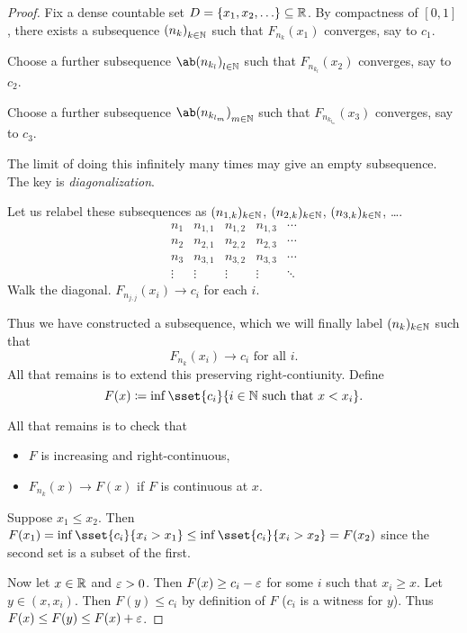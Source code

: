 \begin{proof}
    Fix a dense countable set $D = \set{x_1, x_2, \dots} \subseteq \R$.
    By compactness of $[0, 1]$,
    there exists a subsequence ${(n_k)}_{k \in \mathbb{N}}$ such that
    $F_{n_k}(x_1)$ converges, say to $c_1$.

    Choose a further subsequence ${\ab(n_{k_l})}_{l \in \N}$ such that
    $F_{n_{k_l}}(x_2)$ converges, say to $c_2$.

    Choose a further subsequence ${\ab(n_{k_{l_m}})}_{m \in \N}$ such that
    $F_{n_{k_{l_m}}}(x_3)$ converges, say to $c_3$.

    The limit of doing this infinitely many times may give an empty
    subsequence.
    The key is \emph{diagonalization}.

    Let us relabel these subsequences as
    $(n_{1, k})_{k \in \mathbb{N}}$, $(n_{2, k})_{k \in \mathbb{N}}$,
    $(n_{3, k})_{k \in \mathbb{N}}$, \dots.
    \[
        \begin{array}{c|cccc}
            n_1 & n_{1, 1} & n_{1, 2} & n_{1, 3} & \cdots \\
            n_2 & n_{2, 1} & n_{2, 2} & n_{2, 3} & \cdots \\
            n_3 & n_{3, 1} & n_{3, 2} & n_{3, 3} & \cdots \\
            \vdots & \vdots & \vdots & \vdots & \ddots
        \end{array}
    \] Walk the diagonal.
    $F_{n_{j, j}}(x_i) \to c_i$ for each $i$.

    Thus we have constructed a subsequence, which we will finally
    label $(n_k)_{k \in \mathbb{N}}$ such that \[
        F_{n_k}(x_i) \to c_i \text{ for all } i.
    \] All that remains is to extend this preserving right-contiunity.
    Define \[
        F(x) \coloneq \inf\sset{c_i}{i \in \N
                        \text{ such that } x < x_i}.
    \]

    All that remains is to check that
    \begin{itemize}
        \item $F$ is increasing and right-continuous,
        \item $F_{n_k}(x) \to F(x)$ if $F$ is continuous at $x$.
    \end{itemize}
    Suppose $x_1 \le x_2$.
    Then $F(x_1) = \inf\sset{c_i}{x_i > x_1} \le
    \inf\sset{c_i}{x_i > x_2} = F(x_2)$
    since the second set is a subset of the first.

    Now let $x \in \mathbb{R}$ and $\varepsilon > 0$.
    Then $F(x) \ge c_i - \varepsilon$ for some $i$ such that $x_i \ge x$.
    Let $y \in (x, x_i)$.
    Then $F(y) \le c_i$ by definition of $F$ ($c_i$ is a witness for $y$).
    Thus $F(x) \le F(y) \le F(x) + \varepsilon$.
\end{proof}
